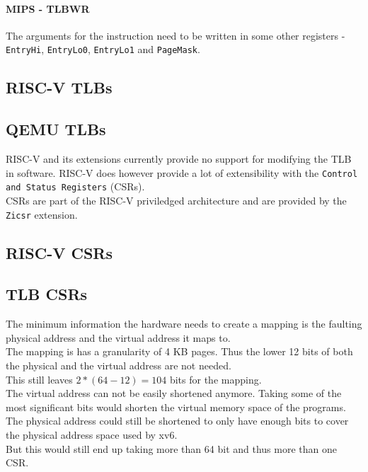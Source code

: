 \paragraph{MIPS - TLBWR} The arguments for the instruction need to be written in some
other registers - \texttt{EntryHi}, \texttt{EntryLo0}, \texttt{EntryLo1} and \texttt{PageMask}.


\subsection{RISC-V TLBs}
\subsection{QEMU TLBs}
RISC-V and its extensions currently provide no support for modifying the TLB in software.
RISC-V does however provide a lot of extensibility with the \texttt{Control and Status Registers} (CSRs).\\
CSRs are part of the RISC-V priviledged architecture and are provided by the \texttt{Zicsr} extension\cite{RISCVInstructionSet}.\\


\subsection{RISC-V CSRs}
\subsection{TLB CSRs}
The minimum information the hardware needs to create a mapping is the faulting physical address and
the virtual address it maps to.\\
The mapping is has a granularity of 4 KB pages. Thus the lower 12 bits of both the physical and the
virtual address are not needed.\\
This still leaves $2*(64-12)=104$ bits for the mapping.\\
The virtual address can not be easily shortened anymore. Taking some of the most significant bits
would shorten the virtual memory space of the programs.\\
The physical address could still be shortened to only have enough bits to cover the physical address
space used by xv6.\\
But this would still end up taking more than 64 bit and thus more than one CSR.


